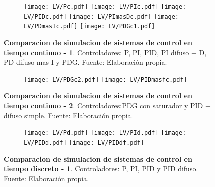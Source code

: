     \begin{figure}[!h]
        \centering
        \begin{subfigure}[t]{0.99\textwidth}
            \centering
            \texttt{[image: LV/Pc.pdf]}
            \texttt{[image: LV/PIc.pdf]}
            \texttt{[image: LV/PIDc.pdf]}
            \texttt{[image: LV/PImasDc.pdf]}
            \texttt{[image: LV/PDmasIc.pdf]}
            \texttt{[image: LV/PDGc1.pdf]}
            \label{fig:simC1}
        \end{subfigure}
        \caption[Comparacion de simulacion de sistemas de control continuos - 1]{\textbf{Comparacion de simulacion de sistemas de control en tiempo continuo - 1}. Controladores: P, PI, PID, PI difuso + D, PD difuso mas I y PDG. Fuente: Elaboración propia. \label{fig:simC1f}}
    \end{figure}

    \begin{figure}[htb]
        \centering
        \begin{subfigure}[t]{0.99\textwidth}
            \centering
            \texttt{[image: LV/PDGc2.pdf]}
            \texttt{[image: LV/PIDmasfc.pdf]}
            \label{fig:simC2}
        \end{subfigure}
        \caption[Comparacion de simulacion de sistemas de control continuos - 2]{\textbf{Comparacion de simulacion de sistemas de control en tiempo continuo - 2}. Controladores:PDG con saturador y PID + difuso simple. Fuente: Elaboración propia. \label{fig:simC2f}}
    \end{figure}

    \begin{figure}[htb]
        \centering
        \begin{subfigure}[t]{0.99\textwidth}
            \centering
            \texttt{[image: LV/Pd.pdf]}
            \texttt{[image: LV/PId.pdf]}
            \texttt{[image: LV/PIDd.pdf]}
            \texttt{[image: LV/PIDdf.pdf]}
            \label{fig:simD1}
        \end{subfigure}
        \caption[Comparacion de simulacion de sistemas de control discretos - 1]{\textbf{Comparacion de simulacion de sistemas de control en tiempo discreto - 1}. Controladores: P, PI, PID y PID difuso. Fuente: Elaboración propia. \label{fig:simD1f}}
    \end{figure}

